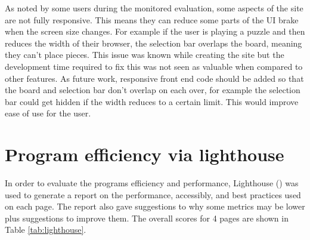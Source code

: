 \documentclass{l4proj}
\begin{document}
As noted by some users during the monitored evaluation, some aspects of the site are not fully responsive. This means they can reduce some parts of the UI brake when the screen size changes. For example if the user is playing a puzzle and then reduces the width of their browser, the selection bar overlaps the board, meaning they can't place pieces. This issue was known while creating the site but the development time required to fix this was not seen as valuable when compared to other features. As future work, responsive front end code should be added so that the board and selection bar don't overlap on each over, for example the selection bar could get hidden if the width reduces to a certain limit. This would improve ease of use for the user.


\section{Program efficiency via lighthouse}
\label{section:efficiency}
In order to evaluate the programs efficiency and performance, Lighthouse (\cite{noauthor_lighthouse_nodate}) was used to generate a report on the performance, accessibly, and best practices used on each page. The report also gave suggestions to why some metrics may be lower plus suggestions to improve them. The overall scores for 4 pages are shown in Table \ref{tab:lighthouse}.  
\end{document}
